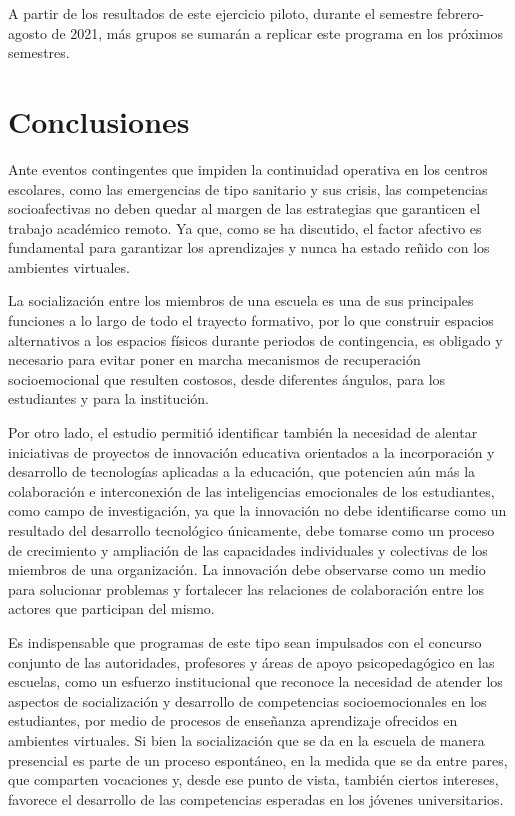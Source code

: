 \documentclass{textolivre}
\begin{document}
A partir de los resultados de este ejercicio piloto, durante el semestre febrero-agosto de 2021, más grupos se sumarán a replicar este programa en los próximos semestres.

\section{Conclusiones}
Ante eventos contingentes que impiden la continuidad operativa en los centros escolares, como las emergencias de tipo sanitario y sus crisis, las competencias socioafectivas no deben quedar al margen de las estrategias que garanticen el trabajo académico remoto. Ya que, como se ha discutido, el factor afectivo es fundamental para garantizar los aprendizajes y nunca ha estado reñido con los ambientes virtuales.

La socialización entre los miembros de una escuela es una de sus principales funciones a lo largo de todo el trayecto formativo, por lo que construir espacios alternativos a los espacios físicos durante periodos de contingencia, es obligado y necesario para evitar poner en marcha mecanismos de recuperación socioemocional que resulten costosos, desde diferentes ángulos, para los estudiantes y para la institución.

Por otro lado, el estudio permitió identificar también la necesidad de alentar iniciativas de proyectos de innovación educativa orientados a la incorporación y desarrollo de tecnologías aplicadas a la educación, que potencien aún más la colaboración e interconexión de las inteligencias emocionales de los estudiantes, como campo de investigación, ya que la innovación  no debe identificarse como un resultado del desarrollo tecnológico únicamente, debe tomarse como un proceso de crecimiento y ampliación de las capacidades individuales y colectivas de los  miembros de una organización. La innovación debe observarse como un medio para solucionar problemas y fortalecer las relaciones de colaboración entre los actores que participan del mismo.

Es indispensable que programas de este tipo sean impulsados con el concurso conjunto de las autoridades, profesores y áreas de apoyo psicopedagógico en las escuelas, como un esfuerzo institucional que reconoce la necesidad de atender los aspectos de socialización y desarrollo de competencias socioemocionales en los estudiantes, por medio de procesos de enseñanza aprendizaje ofrecidos en ambientes virtuales. Si bien la socialización que se da en la escuela de manera presencial es parte de un proceso espontáneo, en la medida que se da entre pares, que comparten vocaciones y, desde ese punto de vista, también ciertos intereses, favorece el desarrollo de las competencias esperadas en los jóvenes universitarios. 
\end{document}
